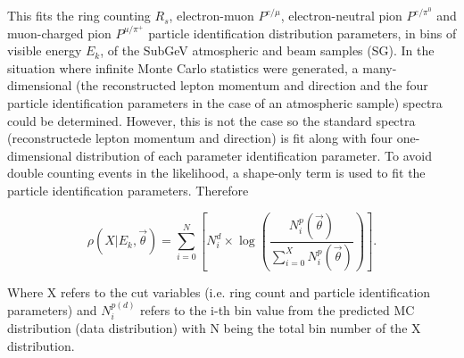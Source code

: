 This fits the ring counting $R_s$, electron-muon $P^{e/\mu}$, electron-neutral pion $P^{e/\pi^0}$ and muon-charged pion $P^{\mu/\pi^+}$ particle identification distribution parameters, in bins of visible energy $E_k$, of the SubGeV atmospheric and beam samples (SG). In the situation where infinite Monte Carlo statistics were generated, a many-dimensional (the reconstructed lepton momentum and direction and the four particle identification parameters in the case of an atmospheric sample) spectra could be determined. However, this is not the case so the standard spectra (reconstructede lepton momentum and direction) is fit along with four one-dimensional distribution of each parameter identification parameter. To avoid double counting events in the likelihood, a shape-only term is used to fit the particle identification parameters. Therefore

\begin{equation}
\rho(X | E_k, \vec{\theta}) = \sum^{N}_{i = 0} \left[ N_i^d \times \log \left( \frac{N_i^p (\vec{\theta})}{\sum^{X}_{i = 0}N_i^p (\vec{\theta})} \right) \right].
\end{equation}

Where X refers to the cut variables (i.e. ring count and particle identification parameters) and $N_{i}^{p(d)}$ refers to the i-th bin value from the predicted MC distribution (data distribution) with N being the total bin number of the X distribution.
